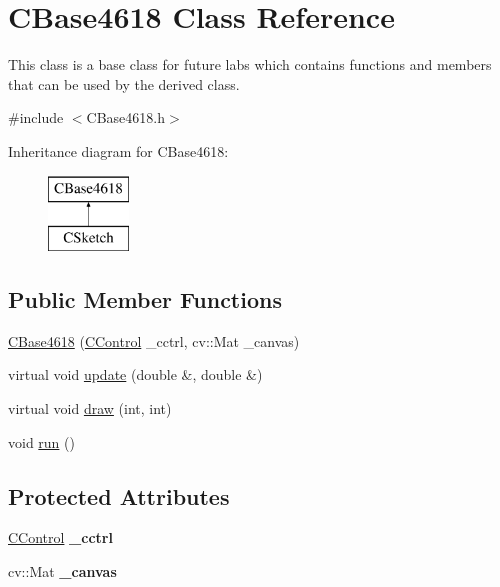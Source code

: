 \hypertarget{class_c_base4618}{}\section{C\+Base4618 Class Reference}
\label{class_c_base4618}


This class is a base class for future labs which contains functions and members that can be used by the derived class.  




{\ttfamily \#include $<$C\+Base4618.\+h$>$}

Inheritance diagram for C\+Base4618\+:\begin{figure}[H]
\begin{center}
\leavevmode
\includegraphics[height=2.000000cm]{class_c_base4618}
\end{center}
\end{figure}
\subsection*{Public Member Functions}
\begin{DoxyCompactItemize}
\item 
\hyperlink{class_c_base4618_a43202fe8782b8620c889b3d935759cdd}{C\+Base4618} (\hyperlink{class_c_control}{C\+Control} \+\_\+cctrl, cv\+::\+Mat \+\_\+canvas)
\item 
virtual void \hyperlink{class_c_base4618_a46e2ad109d3c7c877d00cff9093736c7}{update} (double \&, double \&)
\item 
virtual void \hyperlink{class_c_base4618_aa4e8190003db02c98e7e6bdcfdf0ee1a}{draw} (int, int)
\item 
void \hyperlink{class_c_base4618_a535e816d735d10d6048dd39cd893d393}{run} ()
\end{DoxyCompactItemize}
\subsection*{Protected Attributes}
\begin{DoxyCompactItemize}
\item 
\hypertarget{class_c_base4618_ae97e0017b88b5a71565e522ed0c04413}{}\label{class_c_base4618_ae97e0017b88b5a71565e522ed0c04413} 
\hyperlink{class_c_control}{C\+Control} {\bfseries \+\_\+cctrl}
\item 
\hypertarget{class_c_base4618_a1b925f757247b33ca2072f777f24582d}{}\label{class_c_base4618_a1b925f757247b33ca2072f777f24582d} 
cv\+::\+Mat {\bfseries \+\_\+canvas}
\end{DoxyCompactItemize}


